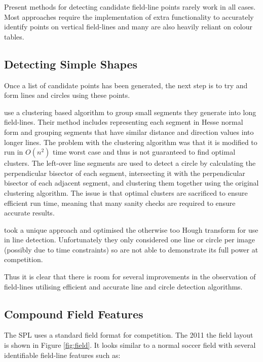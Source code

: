 \documentclass{article}
\begin{document}
Present methods for detecting candidate field-line points rarely work in all cases. Most approaches require the implementation of extra functionality to accurately identify points on vertical field-lines and many are also heavily reliant on colour tables.

\subsection{Detecting Simple Shapes}

Once a list of candidate points has been generated, the next step is to try and form lines and circles using these points. 

\citeauthor{BHumanCodeRelease2010}  use a clustering based algorithm to group small segments they generate into long field-lines. Their method includes representing each segment in Hesse normal form and grouping segments that have similar distance and direction values into longer lines. The problem with the clustering algorithm was that it is modified to run in $O(n^2)$ time worst case and thus is not guaranteed to find optimal clusters. The left-over line segments are used to detect a circle by calculating the perpendicular bisector of each segment, intersecting it with the perpendicular bisector of each adjacent segment, and clustering them together using the original clustering algorithm. The issue is that optimal clusters are sacrificed to ensure efficient run time, meaning that many sanity checks are required to ensure accurate results.

\citeauthor{UPenn2010}  took a unique approach and optimised the otherwise too Hough transform \cite{HoughTransform} for use in line detection. Unfortunately they only considered one line or circle per image (possibly due to time constraints) so are not able to demonstrate its full power at competition.

Thus it is clear that there is room for several improvements in the observation of field-lines utilising efficient and accurate line and circle detection algorithms.

\subsection{Compound Field Features}
The SPL uses a standard field format for competition. The 2011 the field layout is shown in Figure \ref{fig:field}. It looks similar to a normal soccer field with several identifiable field-line features such as:
\end{document}
